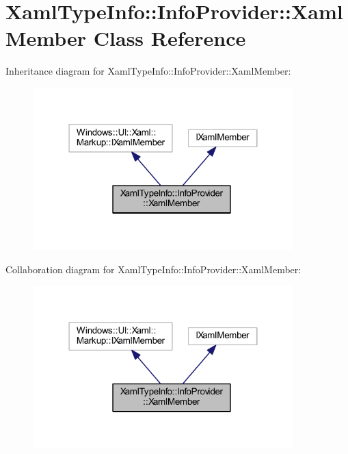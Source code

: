 \hypertarget{class_xaml_type_info_1_1_info_provider_1_1_xaml_member}{}\section{Xaml\+Type\+Info\+:\+:Info\+Provider\+:\+:Xaml\+Member Class Reference}
\label{class_xaml_type_info_1_1_info_provider_1_1_xaml_member}


Inheritance diagram for Xaml\+Type\+Info\+:\+:Info\+Provider\+:\+:Xaml\+Member\+:\nopagebreak
\begin{figure}[H]
\begin{center}
\leavevmode
\includegraphics[width=286pt]{class_xaml_type_info_1_1_info_provider_1_1_xaml_member__inherit__graph}
\end{center}
\end{figure}


Collaboration diagram for Xaml\+Type\+Info\+:\+:Info\+Provider\+:\+:Xaml\+Member\+:\nopagebreak
\begin{figure}[H]
\begin{center}
\leavevmode
\includegraphics[width=286pt]{class_xaml_type_info_1_1_info_provider_1_1_xaml_member__coll__graph}
\end{center}
\end{figure}
